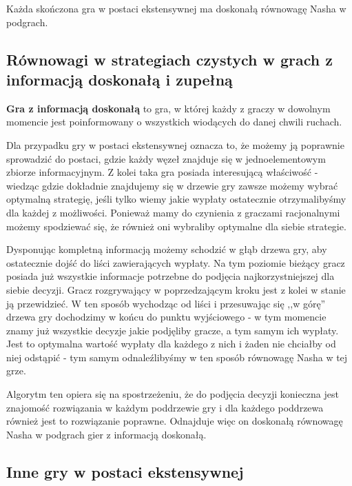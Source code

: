 \documentclass[polish]{standalone}
\begin{document}
\begin{theorem}
Każda skończona gra w postaci ekstensywnej ma doskonałą równowagę Nasha w podgrach.
\end{theorem}

\subsection{Równowagi w strategiach czystych w grach z informacją doskonałą i zupełną}

\begin{definition}
\textbf{Gra z informacją doskonałą} to gra, w której każdy z graczy w dowolnym momencie jest poinformowany o wszystkich
wiodących do danej chwili ruchach.
\end{definition}

Dla przypadku gry w postaci ekstensywnej oznacza to, że możemy ją poprawnie sprowadzić do postaci, gdzie każdy węzeł
znajduje się w jednoelementowym zbiorze informacyjnym. Z kolei taka gra posiada interesującą właściwość - wiedząc gdzie
dokładnie znajdujemy się w drzewie gry zawsze możemy wybrać optymalną strategię, jeśli tylko wiemy jakie wypłaty
ostatecznie otrzymalibyśmy dla każdej z możliwości. Ponieważ mamy do czynienia z graczami racjonalnymi możemy spodziewać
się, że również oni wybraliby optymalne dla siebie strategie.

Dysponując kompletną informacją możemy schodzić w głąb drzewa gry, aby ostatecznie dojść do liści zawierających wypłaty.
Na tym poziomie bieżący gracz posiada już wszystkie informacje potrzebne do podjęcia najkorzystniejszej dla siebie
decyzji. Gracz rozgrywający w poprzedzającym kroku jest z kolei w stanie ją przewidzieć. W ten sposób wychodząc od liści
i przesuwając się ,,w górę'' drzewa gry dochodzimy w końcu do punktu wyjściowego - w tym momencie znamy już wszystkie
decyzje jakie podjęliby gracze, a tym samym ich wypłaty. Jest to optymalna wartość wypłaty dla każdego z nich i żaden
nie chciałby od niej odstąpić - tym samym odnaleźlibyśmy w ten sposób równowagę Nasha w tej grze.

Algorytm ten opiera się na spostrzeżeniu, że do podjęcia decyzji konieczna jest znajomość rozwiązania w każdym poddrzewie
gry i dla każdego poddrzewa również jest to rozwiązanie poprawne. Odnajduje więc on doskonałą równowagę Nasha w podgrach
gier z informacją doskonałą.

\subsection{Inne gry w postaci ekstensywnej}
\end{document}
